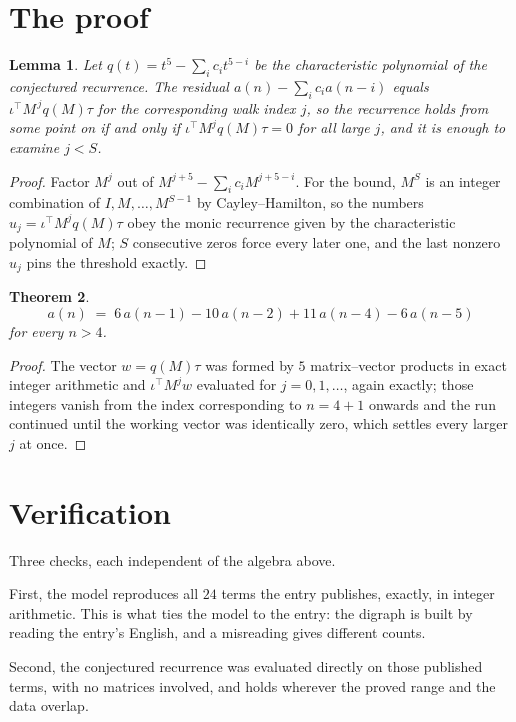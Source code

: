 \documentclass[11pt,a4paper]{article}
\theoremstyle{plain}
\newtheorem{theorem}{Theorem}
\newtheorem{lemma}[theorem]{Lemma}
\theoremstyle{definition}
\begin{document}
\section{The proof}

\begin{lemma}\label{lem:crit}
Let $q(t)=t^{5}-\sum_i c_it^{5-i}$ be the characteristic polynomial of the
conjectured recurrence. The residual $a(n)-\sum_ic_ia(n-i)$ equals
$\iota^{\!\top}M^{\,j}q(M)\tau$ for the corresponding walk index $j$, so the recurrence
holds from some point on if and only if $\iota^{\!\top}M^{j}q(M)\tau=0$ for all large $j$,
and it is enough to examine $j<S$.
\end{lemma}

\begin{proof}
Factor $M^{j}$ out of $M^{j+5}-\sum_ic_iM^{j+5-i}$. For the bound, $M^{S}$
is an integer combination of $I,M,\dots,M^{S-1}$ by Cayley--Hamilton, so the numbers
$u_j=\iota^{\!\top}M^{j}q(M)\tau$ obey the monic recurrence given by the characteristic
polynomial of $M$; $S$ consecutive zeros force every later one, and the last nonzero $u_j$
pins the threshold exactly.
\end{proof}

\begin{theorem}
\[
a(n)\;=\;6\,a(n-1) - 10\,a(n-2) + 11\,a(n-4) - 6\,a(n-5)
\]
for every $n>4$.
\end{theorem}

\begin{proof}
The vector $w=q(M)\tau$ was formed by $5$ matrix--vector products in exact integer
arithmetic and $\iota^{\!\top}M^{j}w$ evaluated for $j=0,1,\dots$, again exactly; those
integers vanish from the index corresponding to $n=4+1$ onwards and the run continued
until the working vector was identically zero, which settles every larger $j$ at once.
\end{proof}

\section{Verification}

Three checks, each independent of the algebra above.

First, the model reproduces all $24$ terms the entry publishes, exactly, in integer
arithmetic. This is what ties the model to the entry: the digraph is built by reading the
entry's English, and a misreading gives different counts.

Second, the conjectured recurrence was evaluated directly on those published terms, with no
matrices involved, and holds wherever the proved range and the data overlap.
\end{document}
